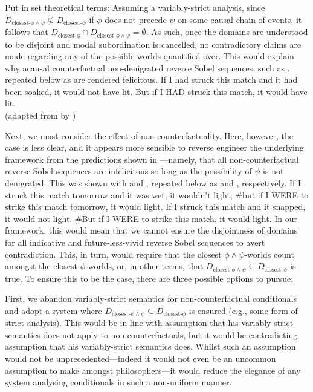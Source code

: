 \noindent Put in set theoretical terms: Assuming a variably-strict analysis, since $D_{\text{closest-}\phi\land\psi}\not\subseteq D_{\text{closest-}\phi}$ if $\phi$ does not precede $\psi$ on some causal chain of events, it follows that $D_{\text{closest-}\phi}\cap D_{\text{closest-}\phi\land\psi}=\emptyset$. As such, once the domains are understood to be disjoint and modal subordination is cancelled, no contradictory claims are made regarding any of the possible worlds quantified over. This would explain why acausal counterfactual non-denigrated reverse Sobel sequences, such as , repeated below as  are rendered felicitous.
\ex{}If I had struck this match and it had been soaked, it would not have lit. But if I \MakeUppercase{had} struck this match, it would have lit.\\%
\emptyfill(adapted from \textcite[p.~106]{Stalnaker1968} by \textcite[p.~487]{Lewis2018})
\xe

Next, we must consider the effect of non-counterfactuality. Here, however, the case is less clear, and it appears more sensible to reverse engineer the underlying framework from the predictions shown in ---namely, that all non-counterfactual reverse Sobel sequences are infelicitous so long as the possibility of $\psi$ is not denigrated. This was shown with  and , repeated below as  and , respectively.
\ex{}
    If I struck this match tomorrow and it was wet, it wouldn't light; \#but if I \MakeUppercase{were} to strike this match tomorrow, it would light.
\xe
\ex{}
If I struck this match and it snapped, it would not light. \#But if I \MakeUppercase{were} to strike this match, it would light.
\xe
In our framework, this would mean that we cannot ensure the disjointness of domains for all indicative and future-less-vivid reverse Sobel sequences to avert contradiction. This, in turn, would require that the closest $\phi\land\psi$-worlds count amongst the closest $\phi$-worlds, or, in other terms, that $D_{\text{closest-}\phi\land\psi}\subseteq D_{\text{closest-}\phi}$ is true. To ensure this to be the case, there are three possible options to pursue: 

First, we abandon variably-strict semantics for non-counterfactual conditionals and adopt a system where $D_{\text{closest-}\phi\land\psi}\subseteq D_{\text{closest-}\phi}$ is ensured (e.g., some form of strict analysis). This would be in line with  assumption that his variably-strict semantics does not apply to non-counterfactuals, but it would be contradicting  assumption that his variably-strict semantics does. Whilst such an assumption would not be unprecedented---indeed it would not even be an uncommon assumption to make amongst philosophers---it would reduce the elegance of any system analysing conditionals in such a non-uniform manner.

